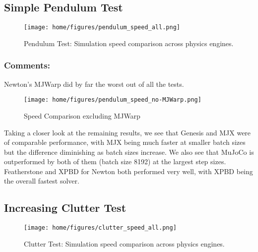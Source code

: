 \documentclass[11pt,a4paper]{article}
\begin{document}
\subsection{Simple Pendulum Test}
\FloatBarrier
\begin{figure}[h!]
    \centering
    \texttt{[image: home/figures/pendulum\_speed\_all.png]}
    \caption{Pendulum Test: Simulation speed comparison across physics engines.}
    \label{fig:pendulum_speed_comparison}
\end{figure}

\FloatBarrier

\subsubsection{Comments:}
Newton's MJWarp did by far the worst out of all the tests.
\begin{figure}[H]
    \texttt{[image: home/figures/pendulum\_speed\_no-MJWarp.png]}
        \caption{Speed Comparison excluding MJWarp}
    \label{fig:pendulum_speed_comparison_no_MJWarp}
\end{figure}\noindent 
Taking a closer look at the remaining results, we see that Genesis and MJX were of comparable performance, with MJX being much faster at smaller batch sizes but the difference diminishing as batch sizes increase. We also see that MuJoCo is outperformed by both of them (batch size 8192) at the largest step sizes. \\
Featherstone and XPBD for Newton both performed very well, with XPBD being the overall fastest solver.

\subsection{Increasing Clutter Test}
\begin{figure}[H]
    \centering
    \texttt{[image: home/figures/clutter\_speed\_all.png]}
    \caption{Clutter Test: Simulation speed comparison across physics engines.}
    \label{fig:clutter_speed_comparison}
\end{figure}
\end{document}
